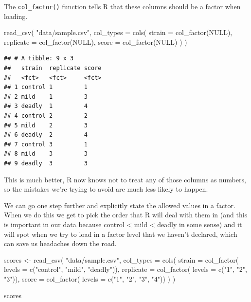 \documentclass[
]{book}
\newenvironment{Shaded}{\begin{snugshade}}{\end{snugshade}}
\newcommand{\AttributeTok}[1]{\textcolor[rgb]{0.77,0.63,0.00}{#1}}
\newcommand{\ConstantTok}[1]{\textcolor[rgb]{0.00,0.00,0.00}{#1}}
\newcommand{\FunctionTok}[1]{\textcolor[rgb]{0.00,0.00,0.00}{#1}}
\newcommand{\NormalTok}[1]{#1}
\newcommand{\OtherTok}[1]{\textcolor[rgb]{0.56,0.35,0.01}{#1}}
\newcommand{\StringTok}[1]{\textcolor[rgb]{0.31,0.60,0.02}{#1}}
\begin{document}
The \texttt{col\_factor()} function tells R that these columns should be a factor when loading.

\begin{Shaded}
\begin{Highlighting}[]
\FunctionTok{read\_csv}\NormalTok{(}
  \StringTok{"data/sample.csv"}\NormalTok{,}
  \AttributeTok{col\_types =} \FunctionTok{cols}\NormalTok{(}
    \AttributeTok{strain =} \FunctionTok{col\_factor}\NormalTok{(}\ConstantTok{NULL}\NormalTok{),}
    \AttributeTok{replicate =} \FunctionTok{col\_factor}\NormalTok{(}\ConstantTok{NULL}\NormalTok{),}
    \AttributeTok{score =} \FunctionTok{col\_factor}\NormalTok{(}\ConstantTok{NULL}\NormalTok{)}
\NormalTok{  )}
\NormalTok{)}
\end{Highlighting}
\end{Shaded}

\begin{verbatim}
## # A tibble: 9 x 3
##   strain  replicate score
##   <fct>   <fct>     <fct>
## 1 control 1         1    
## 2 mild    1         3    
## 3 deadly  1         4    
## 4 control 2         2    
## 5 mild    2         3    
## 6 deadly  2         4    
## 7 control 3         1    
## 8 mild    3         3    
## 9 deadly  3         3
\end{verbatim}

This is much better, R now knows not to treat any of those columns as numbers, so the mistakes we're trying to avoid are much less likely to happen.

We can go one step further and explicitly state the allowed values in a factor. When we do this we get to pick the order that R will deal with them in (and this is important in our data because control \textless{} mild \textless{} deadly in some sense) and it will spot when we try to load in a factor level that we haven't declared, which can save us headaches down the road.

\begin{Shaded}
\begin{Highlighting}[]
\NormalTok{scores }\OtherTok{\textless{}{-}} \FunctionTok{read\_csv}\NormalTok{(}
  \StringTok{"data/sample.csv"}\NormalTok{,}
  \AttributeTok{col\_types =} \FunctionTok{cols}\NormalTok{(}
    \AttributeTok{strain =} \FunctionTok{col\_factor}\NormalTok{( }\AttributeTok{levels =} \FunctionTok{c}\NormalTok{(}\StringTok{"control"}\NormalTok{, }\StringTok{"mild"}\NormalTok{, }\StringTok{"deadly"}\NormalTok{)),}
    \AttributeTok{replicate =} \FunctionTok{col\_factor}\NormalTok{( }\AttributeTok{levels =} \FunctionTok{c}\NormalTok{(}\StringTok{"1"}\NormalTok{, }\StringTok{"2"}\NormalTok{, }\StringTok{"3"}\NormalTok{)),}
    \AttributeTok{score =} \FunctionTok{col\_factor}\NormalTok{( }\AttributeTok{levels =} \FunctionTok{c}\NormalTok{(}\StringTok{"1"}\NormalTok{, }\StringTok{"2"}\NormalTok{, }\StringTok{"3"}\NormalTok{, }\StringTok{"4"}\NormalTok{))}
\NormalTok{  )}
\NormalTok{)}

\NormalTok{scores}
\end{Highlighting}
\end{Shaded}
\end{document}
